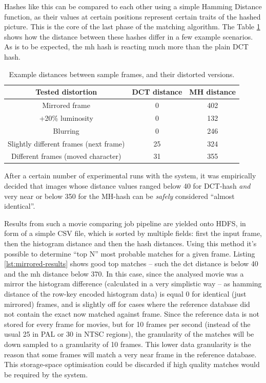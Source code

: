 Hashes like this can be compared to each other using a simple Hamming Distance \cite{hamming-distance} function, as their values at certain positions represent certain traits of the hashed picture. This is the core of the last phase of the matching algorithm. The Table \ref{tab:hash-distances} shows how the distance between these hashes differ in a few example scenarios. As is to be expected, the mh hash is reacting much more than the plain DCT hash. 

\begin{table}[ch!]
  \centering
  \begin{tabular}{|c|c|c|}
    \hline 
    \textbf{Tested distortion}             & \textbf{DCT distance} & \textbf{MH distance} \\ \hline
    Mirrored frame                         & 0                     &  402 \\ \hline
    +20\% luminosity                       & 0                     &  132 \\ \hline
    Blurring                               & 0                     &  246 \\ \hline
    Slightly different frames (next frame) & 25                    &  324 \\ \hline
    Different frames (moved character)     & 31                    &  355 \\ \hline
    
  \end{tabular}
  \caption{Example distances between sample frames, and their distorted versions.}
  \label{tab:hash-distances}
\end{table}

After a certain number of experimental runs with the system, it was empirically decided that images whose distance values ranged below 40 for DCT-hash \textit{and} very near or below 350 for the MH-hash can be \textit{safely} considered ``almost identical''.

Results from such a movie comparing job pipeline are yielded onto HDFS, in form of a simple CSV file, which is sorted by multiple fields: first the input frame, then the histogram distance and then the hash distances. Using this method it's possible to determine ``top N'' most probable matches for a given frame. Listing \ref{lst:mirrored-results} shows good top matches -- such the dct distance is below 40 and the mh distance below 370. In this case, since the analysed movie was a mirror the histogram difference (calculated in a very simplistic way -- as hamming distance of the row-key encoded histogram data) is equal 0 for identical (just mirrored) frames, and is slightly off for cases where the reference database did not contain the exact now matched against frame. Since the reference data is not stored for every frame for movies, but for 10 frames per second (instead of the usual 25 in PAL or 30 in NTSC regions), the granularity of the matches will be down sampled to a granularity of 10 frames. This lower data granularity is the reason that some frames will match a very near frame in the reference database. This storage-space optimisation could be discarded if high quality matches would be required by the system.

